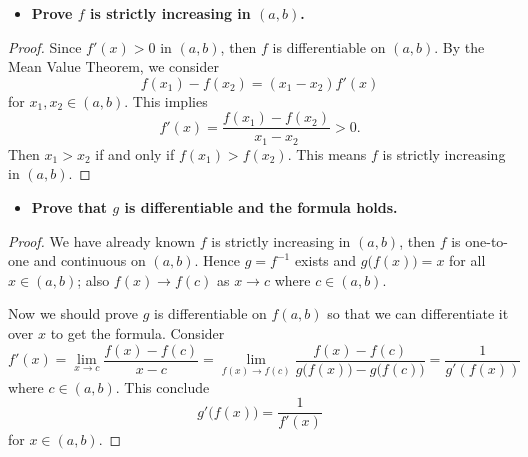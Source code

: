 \begin{Exercise}
	\begin{itemize}
		\item \textbf{Prove $f$ is strictly increasing in $(a,b)$.}
	\end{itemize}
	\begin{proof}
		Since $f'(x) > 0$ in $(a,b)$, then $f$ is differentiable on $(a,b)$. 
		By the Mean Value Theorem, we consider
		$$
		f(x_1) - f(x_2) = (x_1 - x_2) f'(x)
		$$
		for $x_1,x_2\in (a,b)$. This implies
		$$
		f'(x) = \frac{f(x_1)-f(x_2)}{x_1-x_2} > 0.
		$$
		Then $x_1 > x_2$ if and only if $f(x_1) > f(x_2)$. This means $f$ is strictly increasing in $(a,b)$.
	\end{proof}
	\begin{itemize}
		\item \textbf{Prove that $g$ is differentiable and the formula holds.}
	\end{itemize}
	\begin{proof}
		We have already known $f$ is strictly increasing in $(a,b)$, then $f$ is one-to-one and continuous on $(a,b)$. 
		Hence $g = f^{-1}$ exists and $g\big( f(x) \big) = x$ for all $x\in(a,b)$; also $f(x)\to f(c)$ as $x\to c$ where $c\in(a,b)$.
		
		Now we should prove $g$ is differentiable on $f(a,b)$ so that we can differentiate it over $x$ to get the formula.
		Consider
		$$
		f'(x) = \lim_{x\to c}\frac{f(x)-f(c)}{x-c}
		= \lim_{f(x)\to f(c)}\frac{f(x)-f(c)}{g\big( f(x) \big) - g\big( f(c) \big)}
		= \frac{1}{g'(f(x))}
		$$
		where $c\in(a,b)$. This conclude
		$$
		g'\big( f(x) \big) = \frac{1}{f'(x)}
		$$
		for $x\in(a,b)$.
	\end{proof}
\end{Exercise}